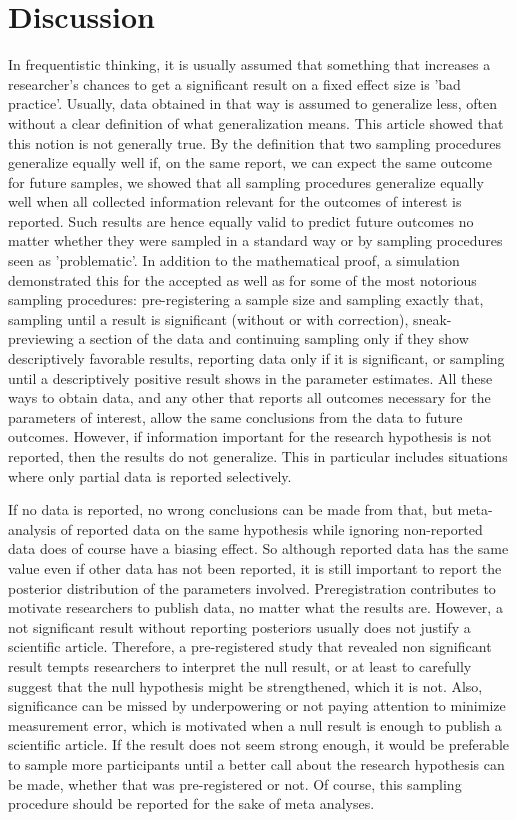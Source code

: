 \documentclass[man]{apa7}
\theoremstyle{definition}
\begin{document}
\section{Discussion}
In frequentistic thinking, it is usually assumed that something that increases a researcher's chances to get a significant result on a fixed effect size is 'bad practice'. Usually, data obtained in that way is assumed to generalize less, often without a clear definition of what generalization means. This article showed that this notion is not generally true. By the definition that two sampling procedures generalize equally well if, on the same report, we can expect the same outcome for future samples, we showed that all sampling procedures generalize equally well when all collected information relevant for the outcomes of interest is reported. Such results are hence equally valid to predict future outcomes no matter whether they were sampled in a standard way or by sampling procedures seen as 'problematic'. In addition to the mathematical proof, a simulation demonstrated this for the accepted as well as for some of the most notorious sampling procedures: pre-registering a sample size and sampling exactly that, sampling until a result is significant (without or with correction), sneak-previewing a section of the data and continuing sampling only if they show descriptively favorable results, reporting data only if it is significant, or sampling until a descriptively positive result shows in the parameter estimates. All these ways to obtain data, and any other that reports all outcomes necessary for the parameters of interest, allow the same conclusions from the data to future outcomes. However, if information important for the research hypothesis is not reported, then the results do not generalize. This in particular includes situations where only partial data is reported selectively.

If no data is reported, no wrong conclusions can be made from that, but meta-analysis of reported data on the same hypothesis while ignoring non-reported data does of course have a biasing effect. So although reported data has the same value even if other data has not been reported, it is still important to report the posterior distribution of the parameters involved. Preregistration contributes to motivate researchers to publish data, no matter what the results are. However, a not significant result without reporting posteriors usually does not justify a scientific article. Therefore, a pre-registered study that revealed non significant result tempts researchers to interpret the null result, or at least to carefully suggest that the null hypothesis might be strengthened, which it is not. Also, significance can be missed by underpowering or not paying attention to minimize measurement error, which is motivated when a null result is enough to publish a scientific article. If the result does not seem strong enough, it would be preferable to sample more participants until a better call about the research hypothesis can be made, whether that was pre-registered or not. Of course, this sampling procedure should be reported for the sake of meta analyses.
\end{document}
